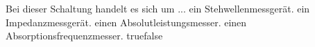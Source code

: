     {Bei dieser Schaltung handelt es sich um ...}
    {ein Stehwellenmessgerät.}
    {ein Impedanzmessgerät.}
    {einen Absolutleistungsmesser.}
    {einen Absorptionsfrequenzmesser.}
    {true}{false}